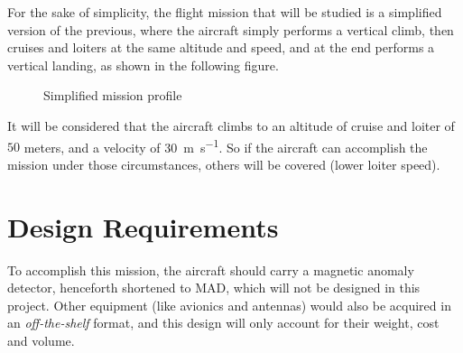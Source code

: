\documentclass[english,fira]{ist-report}
\begin{document}
For the sake of simplicity, the flight mission that will be studied is a simplified version of the previous, where the aircraft simply performs a vertical climb, then cruises and loiters at the same altitude and speed, and at the end performs a vertical landing, as shown in the following figure. 
\begin{figure}[ht]
    \centering
    \caption{Simplified mission  profile}
    \label{Traca}
\end{figure}

It will be considered that the aircraft climbs to an altitude of cruise and loiter of $50$ meters, and a velocity of \SI{30}{\meter\per\second}. So if the aircraft can accomplish the mission under those circumstances, others will be covered (lower loiter speed). 

\chapter{Design Requirements} \label{chap:designreq}

To accomplish this mission, the aircraft should carry a magnetic anomaly detector, henceforth shortened to MAD, which will not be designed in this project. Other equipment (like avionics and antennas) would also be acquired in an \emph{off-the-shelf} format, and this design will only account for their weight, cost and volume.
\end{document}
